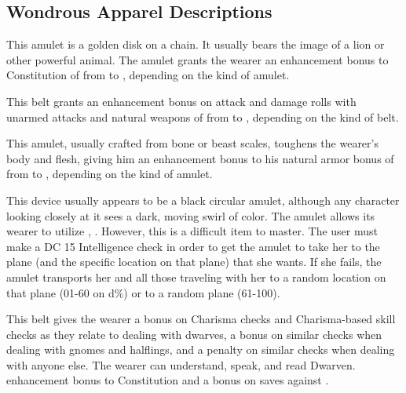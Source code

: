 \subsection{Wondrous Apparel Descriptions}

 This amulet is a golden disk on a chain. It usually bears the image of a lion or other powerful animal. The amulet grants the wearer an enhancement bonus to Constitution of from  to , depending on the kind of amulet.

 This belt grants an enhancement bonus on attack and damage rolls with unarmed attacks and natural weapons of from  to , depending on the kind of belt.

 This amulet, usually crafted from bone or beast scales, toughens the wearer's body and flesh, giving him an enhancement bonus to his natural armor bonus of from  to , depending on the kind of amulet.

 This device usually appears to be a black circular amulet, although any character looking closely at it sees a dark, moving swirl of color. The amulet allows its wearer to utilize , . However, this is a difficult item to master. The user must make a DC 15 Intelligence check in order to get the amulet to take her to the plane (and the specific location on that plane) that she wants. If she fails, the amulet transports her and all those traveling with her to a random location on that plane (01-60 on d\%) or to a random plane (61-100). 

 This belt gives the wearer a   bonus on Charisma checks and Charisma-based skill checks as they relate to dealing with dwarves, a   bonus on similar checks when dealing with gnomes and halflings, and a  penalty on similar checks when dealing with anyone else. The wearer can understand, speak, and read Dwarven.   enhancement bonus to Constitution and a   bonus on saves against .

